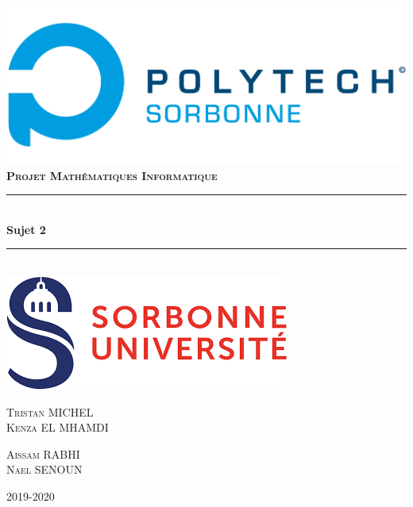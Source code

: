 \documentclass{article}
\newcommand{\HRule}{\rule{\linewidth}{0.5mm}}
\begin{document}

\begin{titlepage}
    \begin{sffamily}
        \begin{center}
        
            \includegraphics[scale=0.2]{../img/Logo_Polytech_Sorbonne}\\[1.5cm]
            \textsc{\Large \bfseries{Projet Mathématiques Informatique}}\\[1.5cm]
            \HRule \\[0.4cm]
            { \huge \bfseries Sujet 2\\[0.4cm]}
            \HRule \\[2cm]
            \includegraphics[scale=0.4]{../img/su}\\[2cm]
            \begin{minipage}{0.4\textwidth}
                \begin{flushleft} \large
                    \textsc{Tristan MICHEL\\ Kenza EL MHAMDI }
                \end{flushleft}
            \end{minipage}
            \begin{minipage}{0.4\textwidth}
                \begin{flushright} \large
                    \textsc{Aissam RABHI\\ Nael SENOUN    }
                \end{flushright}
            \end{minipage}
            \vfill
        
            {\large 2019-2020}
            
        \end{center}
    \end{sffamily}
\end{titlepage}
\end{document}
